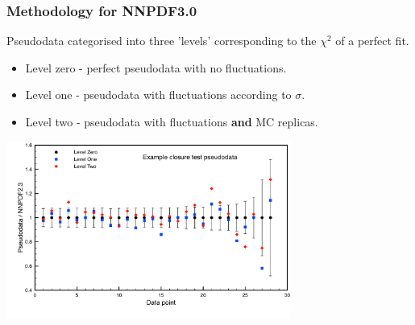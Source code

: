 \documentclass[10pt]{beamer}
\begin{document}
\begin{frame}
\frametitle{Methodology for NNPDF3.0}
{\small Pseudodata categorised into three 'levels' corresponding to the $\chi^2$ of a perfect fit. }
\begin{itemize}
\item Level zero - perfect pseudodata with no fluctuations.
\item Level one  - pseudodata with fluctuations according to $\sigma$.
\item Level two  - pseudodata with fluctuations \textbf{and} MC replicas.
\end{itemize}

\begin{center}
\includegraphics[width=0.7\textwidth]{figures/closuretest_levels.pdf}\\
\end{center}

\end{frame}
\end{document}
